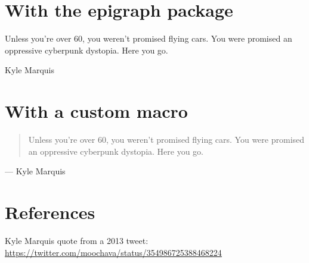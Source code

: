 \documentclass{article}
\begin{document}
\section{With the epigraph package}

\setlength{\epigraphwidth}{\dimexpr .7 \textwidth}

\epigraph{Unless you're over 60, you weren't promised flying cars. You were promised
  an oppressive cyberpunk dystopia. Here you go.}
{Kyle Marquis}

\section{With a custom macro}

\renewcommand{\epigraph}[2]{
    \hfill\begin{minipage}{\dimexpr\textwidth-1cm}%
    \begin{quotation}%
        #1%
    \end{quotation}%
    \begin{flushright}%
        --- #2%
    \end{flushright}%
    \end{minipage}%
}

\epigraph{Unless you're over 60, you weren't promised flying cars. You were promised
  an oppressive cyberpunk dystopia. Here you go.}
{Kyle Marquis}

\section*{References}

Kyle Marquis quote from a 2013 tweet: \\
\url{https://twitter.com/moochava/status/354986725388468224}
\end{document}
